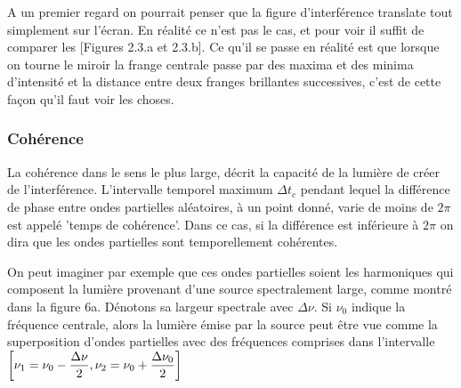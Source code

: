 \documentclass[11pt, openright]{book}
\begin{document}
					A un premier regard on pourrait penser que la figure d'interférence translate tout simplement sur l'écran. En réalité ce n'est pas le cas, et pour voir il suffit de comparer les [Figures 2.3.a et 2.3.b]. Ce qu'il se passe en réalité est que lorsque on tourne le miroir la frange centrale passe par des maxima et des minima d'intensité et la distance entre deux franges brillantes successives, c'est de cette façon qu'il faut voir les choses.

					\subsubsection{Cohérence}

					La cohérence dans le sens le plus large, décrit la capacité de la lumière de créer de l'interférence. L'intervalle temporel maximum $\Delta t_c$ pendant lequel la différence de phase entre ondes partielles aléatoires, à un point donné, varie de moins de $2\pi$ est appelé 'temps de cohérence'. Dans ce cas, si la différence est inférieure à $2\pi$ on dira que les ondes partielles sont temporellement cohérentes.

					On peut imaginer par exemple que ces ondes partielles soient les harmoniques qui composent la lumière provenant d'une source spectralement large, comme montré dans la figure 6a. Dénotons sa largeur spectrale avec $\Delta \nu$. Si $\nu_0$ indique la fréquence centrale, alors la lumière émise par la source peut être vue comme la superposition d'ondes partielles avec des fréquences comprises dans l'intervalle $\displaystyle{\left[ \nu_1=\nu_0-\frac{\Delta\nu}{2}, \nu_2=\nu_0+\frac{\Delta\nu_0}{2} \right] }$ 
\end{document}
